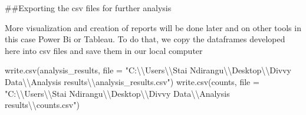 \documentclass[
]{article}
\newenvironment{Shaded}{\begin{snugshade}}{\end{snugshade}}
\newcommand{\AttributeTok}[1]{\textcolor[rgb]{0.77,0.63,0.00}{#1}}
\newcommand{\FunctionTok}[1]{\textcolor[rgb]{0.00,0.00,0.00}{#1}}
\newcommand{\NormalTok}[1]{#1}
\newcommand{\SpecialCharTok}[1]{\textcolor[rgb]{0.00,0.00,0.00}{#1}}
\newcommand{\StringTok}[1]{\textcolor[rgb]{0.31,0.60,0.02}{#1}}
\begin{document}
\#\#Exporting the csv files for further analysis

More visualization and creation of reports will be done later and on
other tools in this case Power Bi or Tableau. To do that, we copy the
dataframes developed here into csv files and save them in our local
computer

\begin{Shaded}
\begin{Highlighting}[]
\FunctionTok{write.csv}\NormalTok{(analysis\_results, }\AttributeTok{file =} \StringTok{"C:}\SpecialCharTok{\textbackslash{}\textbackslash{}}\StringTok{Users}\SpecialCharTok{\textbackslash{}\textbackslash{}}\StringTok{Stai Ndirangu}\SpecialCharTok{\textbackslash{}\textbackslash{}}\StringTok{Desktop}\SpecialCharTok{\textbackslash{}\textbackslash{}}\StringTok{Divvy Data}\SpecialCharTok{\textbackslash{}\textbackslash{}}\StringTok{Analysis results}\SpecialCharTok{\textbackslash{}\textbackslash{}}\StringTok{analysis\_results.csv"}\NormalTok{)}
\FunctionTok{write.csv}\NormalTok{(counts, }\AttributeTok{file =} \StringTok{"C:}\SpecialCharTok{\textbackslash{}\textbackslash{}}\StringTok{Users}\SpecialCharTok{\textbackslash{}\textbackslash{}}\StringTok{Stai Ndirangu}\SpecialCharTok{\textbackslash{}\textbackslash{}}\StringTok{Desktop}\SpecialCharTok{\textbackslash{}\textbackslash{}}\StringTok{Divvy Data}\SpecialCharTok{\textbackslash{}\textbackslash{}}\StringTok{Analysis results}\SpecialCharTok{\textbackslash{}\textbackslash{}}\StringTok{counts.csv"}\NormalTok{)}
\end{Highlighting}
\end{Shaded}
\end{document}
